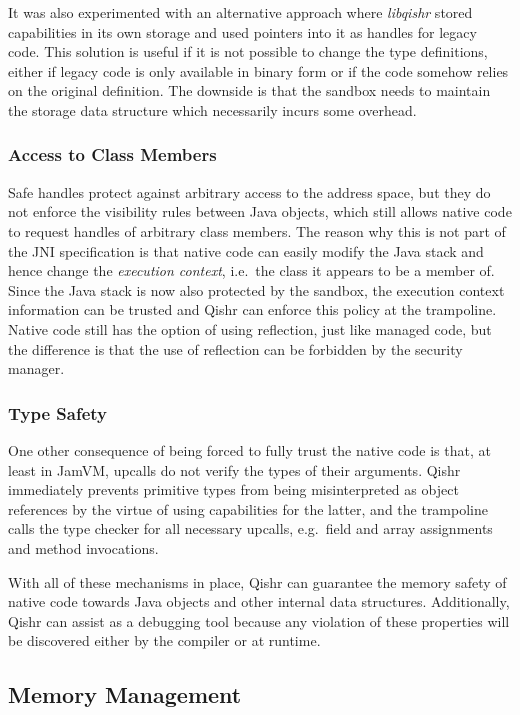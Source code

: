 \documentclass[a4paper,12pt,twoside,openright]{report}
\newcommand{\tool}[1]{\emph{#1}}
\newcommand{\lib}[1]{\tool{lib#1}}
\begin{document}
It was also experimented with an alternative approach where \lib{qishr} stored capabilities in its own storage and used pointers into it as handles for legacy code. This solution is useful if it is not possible to change the type definitions, either if legacy code is only available in binary form or if the code somehow relies on the original definition. The downside is that the sandbox needs to maintain the storage data structure which necessarily incurs some overhead.

\subsubsection{Access to Class Members}

Safe handles protect against arbitrary access to the address space, but they do not enforce the visibility rules between Java objects, which still allows native code to request handles of arbitrary class members. The reason why this is not part of the JNI specification is that native code can easily modify the Java stack and hence change the \emph{execution context}, i.e.\ the class it appears to be a member of. Since the Java stack is now also protected by the sandbox, the execution context information can be trusted and Qishr can enforce this policy at the trampoline. Native code still has the option of using reflection, just like managed code, but the difference is that the use of reflection can be forbidden by the security manager.

\subsubsection{Type Safety}

One other consequence of being forced to fully trust the native code is that, at least in JamVM, upcalls do not verify the types of their arguments. Qishr immediately prevents primitive types from being misinterpreted as object references by the virtue of using capabilities for the latter, and the trampoline calls the type checker for all necessary upcalls, e.g.\ field and array assignments and method invocations.

With all of these mechanisms in place, Qishr can guarantee the memory safety of native code towards Java objects and other internal data structures. Additionally, Qishr can assist as a debugging tool because any violation of these properties will be discovered either by the compiler or at runtime.

\subsection{Memory Management}
\end{document}
